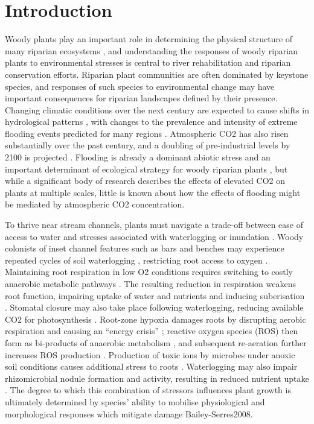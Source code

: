 \documentclass[12pt,a4paper]{memoir}
\begin{document}
\clearpage

\section{Introduction}
Woody plants play an important role in determining the physical structure of many riparian ecosystems \citep{Lawson2015}, and understanding the responses of woody riparian plants to environmental stresses is central to river rehabilitation and riparian conservation efforts. Riparian plant communities are often dominated by keystone species, and responses of such species to environmental change may have important consequences for riparian landscapes defined by their presence. Changing climatic conditions over the next century are expected to cause shifts in hydrological patterns \citep{stocker2013climate}, with changes to the prevalence and intensity of extreme flooding events predicted for many regions \citep{Hennessy2008}. Atmospheric CO2 has also risen substantially over the past century, and a doubling of pre-industrial levels by 2100 is projected \citep{IPCC2014}. Flooding is already a dominant abiotic stress and an important determinant of ecological strategy for woody riparian plants \citep{Blom1996,Lawson2015}, but while a significant body of research describes the effects of elevated CO2 on plants at multiple scales, little is known about how the effects of flooding might be mediated by atmospheric CO2 concentration.

To thrive near stream channels, plants must navigate a trade-off between ease of access to water and stresses associated with waterlogging or inundation \citep{Naiman1993, Colmer2009}. Woody colonists of inset channel features such as bars and benches may experience repeated cycles of soil waterlogging \citep{Corenblit2009}, restricting root access to oxygen \citep{Voesenek2015}. Maintaining root respiration in low O2 conditions requires switching to costly anaerobic metabolic pathways \citep{Drew1997}. The resulting reduction in respiration weakens root function, impairing uptake of water and nutrients \citep{Piedade2010, Voesenek2015} and inducing suberisation \citep{Steudle2000}. Stomatal closure may also take place following waterlogging, reducing available CO2 for photosynthesis \citep{Kozlowski1984, Else2009}. Root-zone hypoxia damages roots by disrupting aerobic respiration and causing an “energy crisis” \citep{Colmer2009}; reactive oxygen species (ROS) then form as bi-products of anaerobic metabolism \citep{Santosa2007}, and  subsequent re-aeration further increases ROS production \citep{Steffens2013}. Production of toxic ions by microbes under anoxic soil conditions causes additional stress to roots \citep{Blom1996}. Waterlogging may also impair rhizomicrobial nodule formation and activity, resulting in reduced nutrient uptake \citep{Dawson1989, Shimono2012}. The degree to which this combination of stressors influences plant growth is ultimately determined by species’ ability to mobilise physiological and morphological responses which mitigate damage {Bailey-Serres2008}.
  
\end{document}
